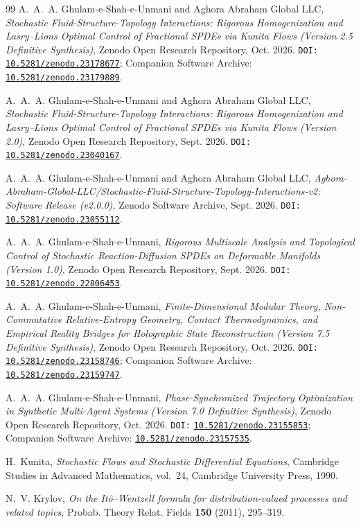 \documentclass[11pt,a4paper,reqno]{article}
\newcommand{\zenodo}[1]{\mbox{\href{https://doi.org/10.5281/zenodo.#1}{\texttt{10.5281/zenodo.#1}}}}
\theoremstyle{plain}
\theoremstyle{definition}
\theoremstyle{remark}
\numberwithin{equation}{section}
\begin{document}
\begin{thebibliography}{99}
A.~A.~A. Ghulam-e-Shah-e-Unmani and {Aghora Abraham Global LLC},
\emph{Stochastic Fluid-Structure-Topology Interactions: Rigorous Homogenization and Lasry--Lions Optimal Control of Fractional SPDEs via Kunita Flows (Version 2.5 Definitive Synthesis)},
Zenodo Open Research Repository, Oct. 2026.
\texttt{DOI:} \zenodo{23178677}; Companion Software Archive: \zenodo{23179889}.

A.~A.~A. Ghulam-e-Shah-e-Unmani and {Aghora Abraham Global LLC},
\emph{Stochastic Fluid-Structure-Topology Interactions: Rigorous Homogenization and Lasry--Lions Optimal Control of Fractional SPDEs via Kunita Flows (Version 2.0)},
Zenodo Open Research Repository, Sept. 2026.
\texttt{DOI:} \zenodo{23040167}.

A.~A.~A. Ghulam-e-Shah-e-Unmani and {Aghora Abraham Global LLC},
\emph{Aghora-Abraham-Global-LLC/Stochastic-Fluid-Structure-Topology-Interactions-v2: Software Release (v2.0.0)},
Zenodo Software Archive, Sept. 2026.
\texttt{DOI:} \zenodo{23055112}.

A.~A.~A. Ghulam-e-Shah-e-Unmani,
\emph{Rigorous Multiscale Analysis and Topological Control of Stochastic Reaction-Diffusion SPDEs on Deformable Manifolds (Version 1.0)},
Zenodo Open Research Repository, Sept. 2026.
\texttt{DOI:} \zenodo{22806453}.

A.~A.~A. Ghulam-e-Shah-e-Unmani,
\emph{Finite-Dimensional Modular Theory, Non-Commutative Relative-Entropy Geometry, Contact Thermodynamics, and Empirical Reality Bridges for Holographic State Reconstruction (Version 7.5 Definitive Synthesis)},
Zenodo Open Research Repository, Oct. 2026.
\texttt{DOI:} \zenodo{23158746}; Companion Software Archive: \zenodo{23159747}.

A.~A.~A. Ghulam-e-Shah-e-Unmani,
\emph{Phase-Synchronized Trajectory Optimization in Synthetic Multi-Agent Systems (Version 7.0 Definitive Synthesis)},
Zenodo Open Research Repository, Oct. 2026.
\texttt{DOI:} \zenodo{23155853}; Companion Software Archive: \zenodo{23157535}.

H.~Kunita,
\emph{Stochastic Flows and Stochastic Differential Equations},
Cambridge Studies in Advanced Mathematics, vol.~24, Cambridge University Press, 1990.

N.~V. Krylov,
\emph{On the It\^o--Wentzell formula for distribution-valued processes and related topics},
Probab. Theory Relat. Fields \textbf{150} (2011), 295--319.


\end{thebibliography}
\end{document}
